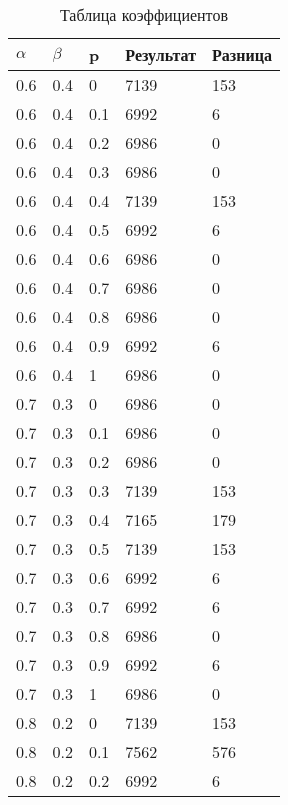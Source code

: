 \begin{table}[ht]
	\centering
	\caption{Таблица коэффициентов}
	\label{table:ref1}
	\begin{tabular}{ | l | l | l | l | l |}
		\hline
		$\alpha$ & $\beta$ & p   & Результат & Разница \\
		\hline
		0.6      & 0.4     & 0   & 7139      & 153     \\
		0.6      & 0.4     & 0.1 & 6992      & 6       \\
		0.6      & 0.4     & 0.2 & 6986      & 0       \\
		0.6      & 0.4     & 0.3 & 6986      & 0       \\
		0.6      & 0.4     & 0.4 & 7139      & 153     \\
		0.6      & 0.4     & 0.5 & 6992      & 6       \\
		0.6      & 0.4     & 0.6 & 6986      & 0       \\
		0.6      & 0.4     & 0.7 & 6986      & 0       \\
		0.6      & 0.4     & 0.8 & 6986      & 0       \\
		0.6      & 0.4     & 0.9 & 6992      & 6       \\
		0.6      & 0.4     & 1   & 6986      & 0       \\
		0.7      & 0.3     & 0   & 6986      & 0       \\
		0.7      & 0.3     & 0.1 & 6986      & 0       \\
		0.7      & 0.3     & 0.2 & 6986      & 0       \\
		0.7      & 0.3     & 0.3 & 7139      & 153     \\
		0.7      & 0.3     & 0.4 & 7165      & 179     \\
		0.7      & 0.3     & 0.5 & 7139      & 153     \\
		0.7      & 0.3     & 0.6 & 6992      & 6       \\
		0.7      & 0.3     & 0.7 & 6992      & 6       \\
		0.7      & 0.3     & 0.8 & 6986      & 0       \\
		0.7      & 0.3     & 0.9 & 6992      & 6       \\
		0.7      & 0.3     & 1   & 6986      & 0       \\
		0.8      & 0.2     & 0   & 7139      & 153     \\
		0.8      & 0.2     & 0.1 & 7562      & 576     \\
		0.8      & 0.2     & 0.2 & 6992      & 6       \\

\end{tabular}
\end{table}
